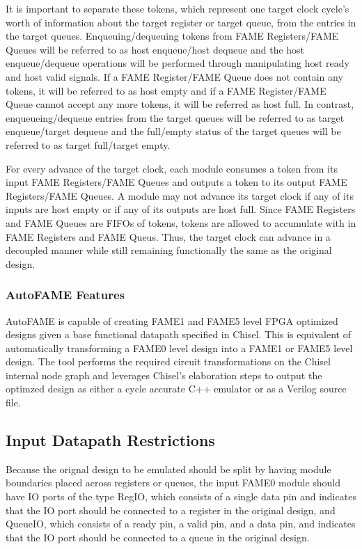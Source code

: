 It is important to separate these tokens, which represent one target clock cycle's worth of information about the target register or target queue, from the entries in the target queues. Enqueuing/dequeuing tokens from FAME Registers/FAME Queues will be referred to as host enqueue/host dequeue and the host enqueue/dequeue operations will be performed through manipulating host ready and host valid signals. If a FAME Register/FAME Queue does not contain any tokens, it will be referred to as host empty and if a FAME Register/FAME Queue cannot accept any more tokens, it will be referred as host full. In contrast, enqueueing/dequeue entries from the target queues will be referred to as target enqueue/target dequeue and the full/empty status of the target queues will be referred to as target full/target empty.

For every advance of the target clock, each module consumes a token from its input FAME Registers/FAME Queues and outputs a token to its output FAME Registers/FAME Queues. A module may not advance its target clock if any of its inputs are host empty or if any of its outputs are host full. Since FAME Registers and FAME Queues are FIFOs of tokens, tokens are allowed to accumulate with in FAME Registers and FAME Queus. Thus, the target clock can advance in a decoupled manner while still remaining functionally the same as the original design. 

\subsubsection{AutoFAME Features}
AutoFAME is capable of creating FAME1 and FAME5 level FPGA optimized designs given a base functional datapath specified in Chisel. This is equivalent of automatically transforming a FAME0 level design into a FAME1 or FAME5 level design. The tool performs the required circuit transformations on the Chisel internal node graph and leverages Chisel's elaboration steps to output the optimzed design as either a cycle accurate C++ emulator or as a Verilog source file. 

\subsection{Input Datapath Restrictions}
\label{section:fameRestrictions}
Because the orignal design to be emulated should be split by having module boundaries placed across registers or queues, the input FAME0 module should have IO ports of the type RegIO, which consists of a single data pin and indicates that the IO port should be connected to a register in the original design, and QueueIO, which consists of a ready pin, a valid pin, and a data pin, and indicates that the IO port should be connected to a queue in the original design.

